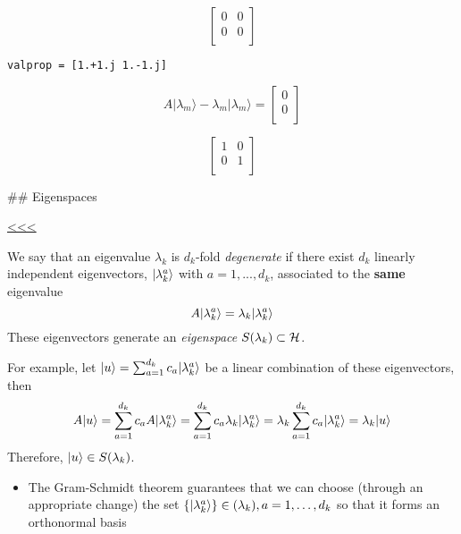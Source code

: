 \documentclass[11pt]{article}
\providecommand{\tightlist}{%
      \setlength{\itemsep}{0pt}\setlength{\parskip}{0pt}}
\newcommand{\prompt}[4]{
        {\ttfamily\llap{{\color{#2}[#3]:\hspace{3pt}#4}}\vspace{-\baselineskip}}
    }
\begin{document}
    $$

\begin{bmatrix}
0 & 0  \\
 0 & 0  \\
 \end{bmatrix}
$$

    
    \begin{Verbatim}[commandchars=\\\{\}]
valprop = [1.+1.j 1.-1.j]
    \end{Verbatim}

    $$
A|\lambda_m \rangle -\lambda_m |\lambda_m\rangle =  
\begin{bmatrix}
0  \\
 0  \\
 \end{bmatrix}
$$

     
            
\prompt{Out}{outcolor}{8}{}
    
    $$

\begin{bmatrix}
1 & 0  \\
 0 & 1  \\
 \end{bmatrix}
$$

    

    \#\# Eigenspaces

\hyperref[top]{<<<}

    We say that an eigenvalue \(\lambda_k\) is \(d_k\)-fold
\emph{degenerate} if there exist \(d_k\) linearly independent
eigenvectors, \(|\lambda_k^{a}\rangle\) with \(a=1,...,d_k\), associated
to the \textbf{same} eigenvalue \[
A|\lambda_k^a\rangle = \lambda_k |\lambda_k^a\rangle
\] These eigenvectors generate an \emph{eigenspace}
\(S(\lambda_k) \subset {\cal H}\).

    For example, let \(|u\rangle = \sum_{a=1}^{d_k} c_a |\lambda^a_k\rangle\) be
a linear combination of these eigenvectors, then \begin{eqnarray}
A |u\rangle 
=  \sum_{a=1}^{d_k} c_a A|\lambda^a_k\rangle  =  \sum_{a=1}^{d_k} c_a \lambda_k |\lambda^a_k\rangle  =   \lambda_k \sum_{a=1}^{d_k} c_a |\lambda^a_k\rangle  = \lambda_k |u\rangle
\end{eqnarray} Therefore, \(|u\rangle \in S(\lambda_k)\).

    \begin{itemize}
\tightlist
\item
  The Gram-Schmidt theorem guarantees that we can choose (through an
  appropriate change) the set
  \(\{|\lambda_{k}^a\rangle\} \in (\lambda_k), a=1,\ldots,d_k\) so that it
  forms an orthonormal basis
\end{itemize}
\end{document}
